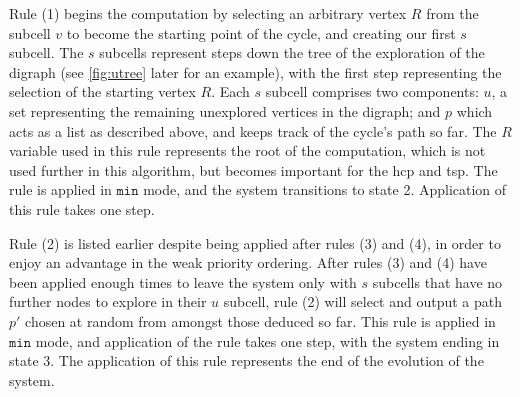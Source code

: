 Rule (1) begins the computation by selecting an arbitrary vertex \(R\) from the subcell \(v\) to become the starting point of the cycle, and creating our first \(s\) subcell.  The \(s\) subcells represent steps down the tree of the exploration of the digraph (see \autoref{fig:utree} later for an example), with the first step representing the selection of the starting vertex \(R\).  Each \(s\) subcell comprises two components: \(u\), a set representing the remaining unexplored vertices in the digraph; and \(p\) which acts as a list as described above, and keeps track of the cycle's path so far.  The \(R\) variable used in this rule represents the root of the computation, which is not used further in this algorithm, but becomes important for the \gls{hcp} and \gls{tsp}.  The rule is applied in \(\mathtt{min}\) mode, and the system transitions to state 2.  Application of this rule takes one step.


Rule (2) is listed earlier despite being applied after rules (3) and (4), in order to enjoy an advantage in the weak priority ordering.  After rules (3) and (4) have been applied enough times to leave the system only with \(s\) subcells that have no further nodes to explore in their \(u\) subcell, rule (2) will select and output a path \(p'\) chosen at random from amongst those deduced so far.  This rule is applied in \(\mathtt{min}\) mode, and application of the rule takes one step, with the system ending in state 3.  The application of this rule represents the end of the evolution of the system.

